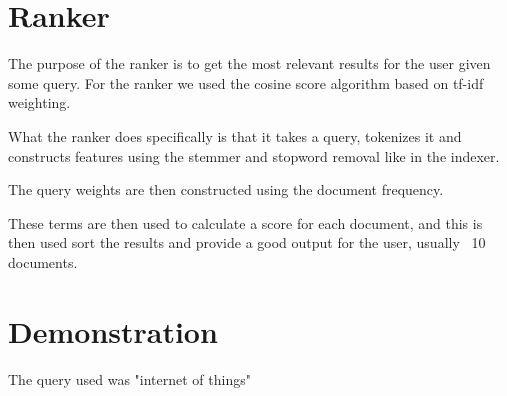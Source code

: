 	\section{Ranker}
	The purpose of the ranker is to get the most relevant results for the user given some query.
	For the ranker we used the cosine score algorithm based on tf-idf weighting.
	
	What the ranker does specifically is that it takes a query, tokenizes it and constructs features using the stemmer and stopword removal like in the indexer.
	
	The query weights are then constructed using the document frequency.
	
	These terms are then used to calculate a score for each document, and this is then used sort the results and provide a good output for the user, usually ~10 documents.
	
	\section{Demonstration}
	The query used was "internet of things"
	


